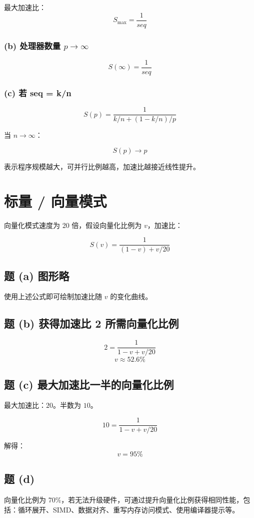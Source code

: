 \documentclass[12pt]{article}
\begin{document}
最大加速比：
\[
S_{\max} = \frac{1}{seq}
\]

\subsubsection*{(b) 处理器数量 $p\to\infty$}

\[
S(\infty)= \frac{1}{seq}
\]

\subsubsection*{(c) 若 seq = k/n}

\[
S(p)=\frac{1}{k/n + (1-k/n)/p}
\]

当 $n\to\infty$：

\[
S(p) \to p
\]

表示程序规模越大，可并行比例越高，加速比越接近线性提升。


\section{标量 / 向量模式}

向量化模式速度为 20 倍，假设向量化比例为 $v$，加速比：

\[
S(v)=\frac{1}{(1-v)+v/20}
\]

\subsection{题 (a) 图形略}
使用上述公式即可绘制加速比随 $v$ 的变化曲线。

\subsection{题 (b) 获得加速比 2 所需向量化比例}

\[
2 = \frac{1}{1-v+v/20}
\]
\[
v \approx 52.6\%
\]

\subsection{题 (c) 最大加速比一半的向量化比例}
最大加速比：$20$。半数为 $10$。

\[
10 = \frac{1}{1-v+v/20}
\]

解得：
\[
v = 95\%
\]

\subsection{题 (d)}
向量化比例为 70\%，若无法升级硬件，可通过提升向量化比例获得相同性能，包括：循环展开、SIMD、数据对齐、重写内存访问模式、使用编译器提示等。
\end{document}
